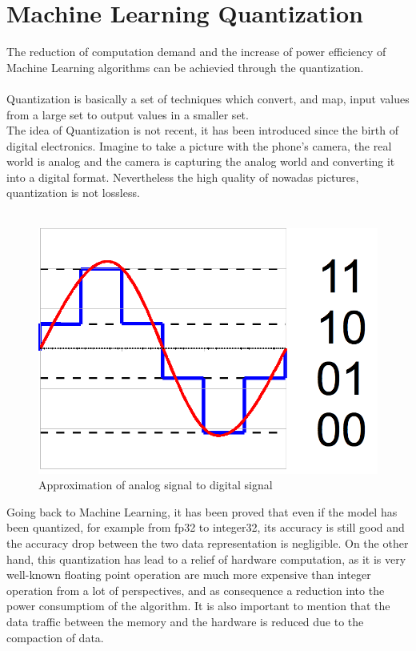 \section{Machine Learning Quantization}
The reduction of computation demand and the increase of power efficiency of Machine Learning algorithms can be achievied through the quantization.\\\\

Quantization is basically a set of techniques which convert, and map, input values from a large set to output values in a smaller set.\\The idea of Quantization is not recent, it has been introduced since the birth of digital electronics. Imagine to take a picture with the phone's camera, the real world is analog and the camera is capturing the analog world and converting it into a digital format.  Nevertheless the high quality of nowadas pictures, quantization is not lossless.\\\\
\begin{figure}[H]
\centering
\captionsetup{justification=centering}
\includegraphics[scale=0.4]{./figure/quant.PNG}
\caption{Approximation of analog signal to digital signal}
\label{fig:quant}
\end{figure}
Going back to Machine Learning, it has been proved that even if the model has been quantized, for example from fp32 to integer32, its accuracy is still good and the accuracy drop between the two data representation is negligible\cite{paper:8}. On the other hand, this quantization has lead to a relief of hardware computation, as it is very well-known floating point operation are much more expensive than integer operation from a lot of perspectives, and as consequence a reduction into the power consumptiom of the algorithm. It is also important to mention that the data traffic between the memory and the hardware is reduced due to the compaction of data.\\\\

